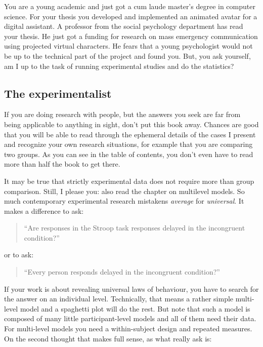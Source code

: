 \documentclass[]{svmono}
\begin{document}
You are a young academic and just got a cum laude master's degree in
computer science. For your thesis you developed and implemented an
animated avatar for a digital assistant. A professor from the social
psychology department has read your thesis. He just got a funding for
research on mass emergency communication using projected virtual
characters. He fears that a young psychologist would not be up to the
technical part of the project and found you. But, you ask yourself, am I
up to the task of running experimental studies and do the statistics?

\subsection{The experimentalist}\label{the-experimentalist}

If you are doing research with people, but the answers you seek are far
from being applicable to anything in sight, don't put this book away.
Chances are good that you will be able to read through the ephemeral
details of the cases I present and recognize your own research
situations, for example that you are comparing two groups. As you can
see in the table of contents, you don't even have to read more than half
the book to get there.

It may be true that strictly experimental data does not require more
than group comparison. Still, I please you: also read the chapter on
multilevel models. So much contemporary experimental research mistakens
\emph{average} for \emph{universal}. It makes a difference to ask:

\begin{quote}
``Are responses in the Stroop task responses delayed in the incongruent
condition?''
\end{quote}

or to ask:

\begin{quote}
``Every person responds delayed in the incongruent condition?''
\end{quote}

If your work is about revealing universal laws of behaviour, you have to
search for the answer on an individual level. Technically, that means a
rather simple multi-level model and a spaghetti plot will do the rest.
But note that such a model is composed of many little participant-level
models and all of them need their data. For multi-level models you need
a within-subject design and repeated measures. On the second thought
that makes full sense, as what really ask is:
\end{document}
